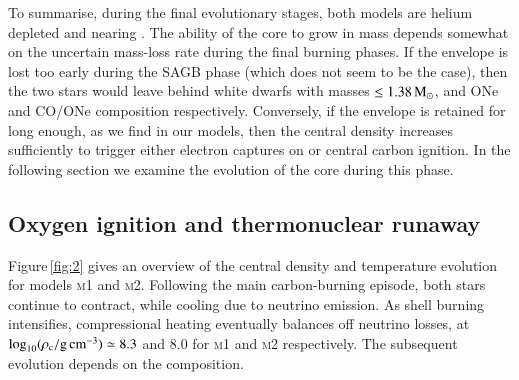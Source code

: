 \documentclass[twocolumn]{aa}
\begin{document}
To summarise, during the final evolutionary stages, both models are helium 
depleted and nearing \mch. The ability of the core 
to grow in mass depends somewhat on the uncertain mass-loss rate during the final burning phases. If the envelope 
is lost too early during the SAGB phase (which does not seem to be the case), then the two stars would 
leave behind white dwarfs with masses $\le 1.38\mathrm{\,M_\odot}$, and ONe and CO/ONe composition respectively. 
Conversely, if the envelope is retained for long enough, as we find in our models, then the central density increases sufficiently to trigger either electron captures on  or central carbon ignition. 
In the following section we examine the evolution of the core during this phase. 




\subsection{Oxygen ignition and thermonuclear runaway}\label{sec:runway}
Figure\,\ref{fig:2} gives an overview of the central density and temperature evolution for models  \textsc{m1} and \textsc{m2}.
Following the main carbon-burning episode, both stars continue to contract, while cooling  due to neutrino  emission. As shell 
burning intensifies, compressional heating eventually balances 
off neutrino losses, at $\log_{10} (\rho_{\mathrm{c}}/ \mathrm{g\,cm^{-3}}) \simeq 8.3$ and 8.0 for \textsc{m1} and \textsc{m2} respectively. The subsequent evolution depends on the composition. 
\end{document}
